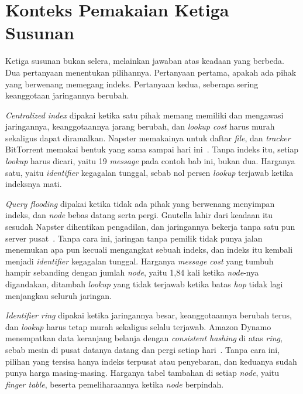 \section{Konteks Pemakaian Ketiga Susunan}
\label{sec:konteks-p2p}

Ketiga susunan bukan selera, melainkan jawaban atas keadaan yang berbeda. Dua
pertanyaan menentukan pilihannya. Pertanyaan pertama, apakah ada pihak yang
berwenang memegang indeks. Pertanyaan kedua, seberapa sering keanggotaan
jaringannya berubah.

\textit{Centralized index} dipakai ketika satu pihak memang memiliki dan
mengawasi jaringannya, keanggotaannya jarang berubah, dan \textit{lookup cost}
harus murah sekaligus dapat diramalkan. Napster memakainya untuk daftar
\textit{file}, dan \textit{tracker} BitTorrent memakai bentuk yang sama sampai
hari ini~\cite{cohen2008bittorrent}. Tanpa indeks itu, setiap \textit{lookup}
harus dicari, yaitu 19 \textit{message} pada contoh bab ini, bukan dua. Harganya satu, yaitu
\textit{identifier} kegagalan tunggal, sebab nol persen \textit{lookup} terjawab ketika
indeksnya mati.

\textit{Query flooding} dipakai ketika tidak ada pihak yang berwenang menyimpan
indeks, dan \textit{node} bebas datang serta pergi. Gnutella lahir dari keadaan
itu sesudah Napster dihentikan pengadilan, dan jaringannya bekerja tanpa satu
pun server pusat~\cite{ripeanu2001gnutella}. Tanpa cara ini, jaringan tanpa
pemilik tidak punya jalan menemukan apa pun kecuali mengangkat sebuah indeks,
dan indeks itu kembali menjadi \textit{identifier} kegagalan tunggal. Harganya \textit{message cost}
yang tumbuh hampir sebanding dengan jumlah \textit{node}, yaitu 1,84 kali ketika
\textit{node}-nya digandakan, ditambah \textit{lookup} yang tidak terjawab
ketika batas \textit{hop} tidak lagi menjangkau seluruh jaringan.

\textit{Identifier ring} dipakai ketika
jaringannya besar, keanggotaannya
berubah terus, dan \textit{lookup} harus tetap murah sekaligus selalu terjawab.
Amazon Dynamo menempatkan data keranjang belanja dengan \textit{consistent
hashing} di atas \textit{ring}, sebab mesin di pusat datanya datang dan pergi
setiap hari~\cite{decandia2007dynamo}. Tanpa cara ini, pilihan yang tersisa
hanya indeks terpusat atau penyebaran, dan keduanya sudah punya harga
masing-masing. Harganya tabel tambahan di setiap \textit{node}, yaitu
\textit{finger table}, beserta pemeliharaannya ketika \textit{node} berpindah.

